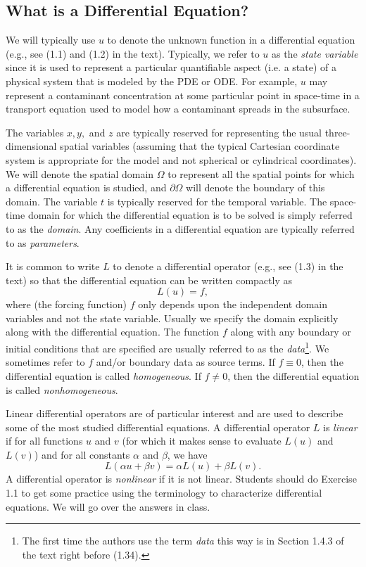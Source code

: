 \documentclass{amsart}
\theoremstyle{plain}
\theoremstyle{definition}
\theoremstyle{remark}
\theoremstyle{definition}
\numberwithin{equation}{section}
\numberwithin{equation}{section}
\begin{document}
\subsection{What is a Differential Equation?}

We will typically use $u$ to denote the unknown function in a differential equation (e.g., see (1.1) and (1.2) in the text). 
Typically, we refer to $u$ as the {\em state variable} since it is used to represent a particular quantifiable aspect (i.e. a state) of a physical system that is modeled by the PDE or ODE. 
For example, $u$ may represent a contaminant concentration at some particular point in space-time in a transport equation used to model how a contaminant spreads in the subsurface. 

The variables $x, y,$ and $z$ are typically reserved for representing the usual three-dimensional spatial variables (assuming that the typical Cartesian coordinate system is appropriate for the model and not spherical or cylindrical coordinates).
We will denote the spatial domain $\Omega$ to represent all the spatial points for which a differential equation is studied, and $\partial\Omega$ will denote the boundary of this domain.
The variable $t$ is typically reserved for the temporal variable.
The space-time domain for which the differential equation is to be solved is simply referred to as the {\em domain}. 
Any coefficients in a differential equation are typically referred to as {\em parameters}.

It is common to write $L$ to denote a differential operator (e.g., see (1.3) in the text) so that the differential equation can be written compactly as
\begin{equation}
	L(u) = f,
\end{equation}
where (the forcing function) $f$ only depends upon the independent domain variables and not the state variable. 
Usually we specify the domain explicitly along with the differential equation. 
The function $f$ along with any boundary or initial conditions that are specified are usually referred to as the {\em data}\footnote{The first time the authors use the term {\em data} this way is in Section 1.4.3 of the text right before (1.34).}. 
We sometimes refer to $f$ and/or boundary data as source terms. 
If $f\equiv 0$, then the differential equation is called {\em homogeneous}.
If $f\neq 0$, then the differential equation is called {\em nonhomogeneous}.

Linear differential operators are of particular interest and are used to describe some of the most studied differential equations. 
A differential operator $L$ is {\em linear} if for all functions $u$ and $v$ (for which it makes sense to evaluate $L(u)$ and $L(v)$) and for all constants $\alpha$ and $\beta$, we have
\[
	L(\alpha u + \beta v) = \alpha L(u) + \beta L(v).
\]
A differential operator is {\em nonlinear} if it is not linear.
Students should do Exercise 1.1 to get some practice using the terminology to characterize differential equations. 
We will go over the answers in class. 
\end{document}
